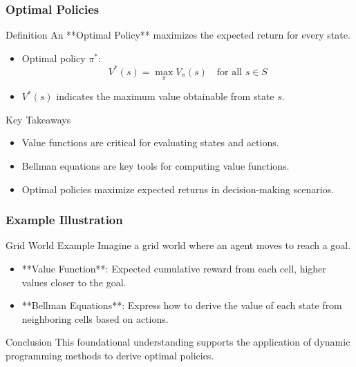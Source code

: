 \documentclass{beamer}
\begin{document}
\begin{frame}[fragile]
    \frametitle{Optimal Policies}
    \begin{block}{Definition}
        An **Optimal Policy** maximizes the expected return for every state.
    \end{block}
    
    \begin{itemize}
        \item Optimal policy \( \pi^* \):
            \[
            V^*(s) = \max_{\pi} V_{\pi}(s) \quad \text{for all } s \in S
            \]
        \item \( V^*(s) \) indicates the maximum value obtainable from state \( s \).
    \end{itemize}
    
    \begin{block}{Key Takeaways}
        \begin{itemize}
            \item Value functions are critical for evaluating states and actions.
            \item Bellman equations are key tools for computing value functions.
            \item Optimal policies maximize expected returns in decision-making scenarios.
        \end{itemize}
    \end{block}
\end{frame}

\begin{frame}[fragile]
    \frametitle{Example Illustration}
    \begin{block}{Grid World Example}
        Imagine a grid world where an agent moves to reach a goal.
    \end{block}
    
    \begin{itemize}
        \item **Value Function**: Expected cumulative reward from each cell, higher values closer to the goal.
        \item **Bellman Equations**: Express how to derive the value of each state from neighboring cells based on actions.
    \end{itemize}
    
    \begin{block}{Conclusion}
        This foundational understanding supports the application of dynamic programming methods to derive optimal policies.
    \end{block}
\end{frame}
\end{document}
